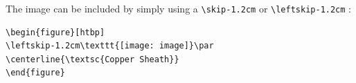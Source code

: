 The image can be included by simply using a \verb+\skip-1.2cm+ or \verb+\leftskip-1.2cm+ :

\begin{verbatim}
\begin{figure}[htbp]
\leftskip-1.2cm\texttt{[image: image]}\par
\centerline{\textsc{Copper Sheath}}
\end{figure}
\end{verbatim}

\long{}






